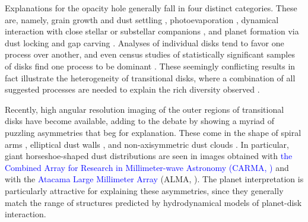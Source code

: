 \documentclass[apj]{emulateapj}
\def\blue#1{\textcolor{blue}{#1}}
\begin{document}
Explanations for the opacity hole generally fall in four distinct
categories. These are, namely, grain growth and dust settling \citep{Brauer07,Dominik-Dullemond08,Zsom11,Birnstiel12}, photoevaporation
\citep{Alexander06,Cieza08,Pascucci-Sterzik09,Owen10}, 
dynamical interaction with close stellar or substellar companions
\citep{Ireland-Kraus08}, and planet
formation via dust locking \citep{Safronov69,Lyttleton72,Goldreich-Ward73,Youdin-Shu02,Johansen07} and gap
carving \citep{Papaloizou-Lin84,Lin-Papaloizou86a,Lin-Papaloizou86b,Bryden99,Paardekooper-Mellema04,Quillen04,Najita07,Andrews11}. 
Analyses of individual disks \citep{Calvet04,Calvet05,Espaillat08} tend to favor one process over another, and even census
studies of statistically significant samples of disks find one process
to be dominant \citep{Najita07,Cieza08}. These
seemingly conflicting results in fact illustrate the
heterogeneity of transitional disks, where a combination of all
suggested processes are needed to explain the rich diversity observed 
\citep{Cieza10,Muzerolle10,Merin10,Rosotti13,Clarke-Owen13}.   

Recently, high angular resolution imaging of the outer regions of transitional 
disks have become available, adding to the debate by showing a myriad of puzzling asymmetries 
that beg for explanation. These come in the shape of spiral arms
\citep{Pietu05,Corder05,Muto12,Tang12},  elliptical dust walls
\citep{Isella12}, and non-axisymmetric dust clouds \citep{Oppenheimer08,Brown09,Casassus12}. In particular, 
giant horseshoe-shaped dust distributions are seen in images obtained with \blue{the Combined Array for Research in Millimeter-wave Astronomy 
(CARMA, \citealt{Isella13})} and with the \blue{Atacama Large Millimeter Array} (ALMA, \citealt{Casassus13,vanderMarel13}). The planet interpretation is particularly attractive for 
explaining these asymmetries, since they generally match the range of structures predicted by hydrodynamical 
models of planet-disk interaction. 
\end{document}
